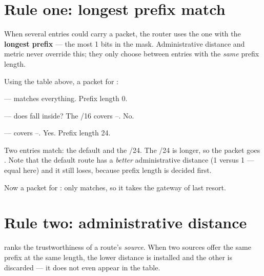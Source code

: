 \section{Rule one: longest prefix match}

\begin{conceptbox}
When several entries could carry a packet, the router uses the one with the
\textbf{longest prefix} --- the most 1 bits in the mask. Administrative distance
and metric never override this; they only choose between entries with the
\emph{same} prefix length.
\end{conceptbox}

\begin{worked}
Using the table above, a packet for :

\begin{tightnum}
  \item {} --- matches everything. Prefix length 0.
  \item {} --- does  fall inside? The /16 covers
        --. No.
  \item {} --- covers --. Yes.
        Prefix length 24.
\end{tightnum}

Two entries match: the default and the /24. The /24 is longer, so the packet goes
. Note that the default route has a \emph{better}
administrative distance (1 versus 1 --- equal here) and it still loses, because
prefix length is decided first.

Now a packet for : only  matches, so it takes the
gateway of last resort.
\end{worked}

\section{Rule two: administrative distance}\label{sec:ad}

\begin{definitionbox}
 ranks the trustworthiness of a route's
\emph{source}. When two sources offer the same prefix at the same length, the
lower distance is installed and the other is discarded --- it does not even
appear in the table.
\end{definitionbox}

